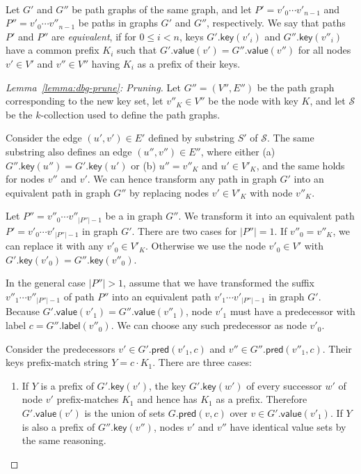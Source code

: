 \documentclass[twoside,leqno,twocolumn]{article}
\newcommand{\abs}[1]{\ensuremath{\lvert #1 \rvert}}
\newcommand{\glabel}{\ensuremath{\mathsf{label}}}
\newcommand{\gpred}{\ensuremath{\mathsf{pred}}}
\newcommand{\gkey}{\ensuremath{\mathsf{key}}}
\newcommand{\gvalue}{\ensuremath{\mathsf{value}}}
\newcommand{\kcollection}[1]{$#1$\nobreakdash-collection}
\begin{document}
\begin{Definition} ~\\
Let $G'$ and $G''$ be path graphs of the same graph, and let $P' = v'_{0} \dotsm v'_{n-1}$ and $P'' = v'_{0} \dotsm v''_{n-1}$ be paths in graphs $G'$ and $G''$, respectively. We say that paths $P'$ and $P''$ are \emph{equivalent}, if for $0 \le i < n$, keys $G'.\gkey(v'_{i})$ and $G''.\gkey(v''_{i})$ have a common prefix $K_{i}$ such that $G'.\gvalue(v') = G''.\gvalue(v'')$ for all nodes $v' \in V'$ and $v'' \in V''$ having $K_{i}$ as a prefix of their keys.
\end{Definition}

\begin{proof}[Lemma~\ref{lemma:dbg-prune}: Pruning]
Let $G'' = (V'', E'')$ be the path graph corresponding to the new key set, let $v''_{K} \in V''$ be the node with key $K$, and let $\mathcal{S}$ be the \kcollection{k} used to define the path graphs.

Consider the edge $(u', v') \in E'$ defined by substring $S'$ of $\mathcal{S}$. The same substring also defines an edge $(u'', v'') \in E''$, where either (a) $G''.\gkey(u'') = G'.\gkey(u')$ or (b) $u'' = v''_{K}$ and $u' \in V'_{K}$, and the same holds for nodes $v''$ and $v'$. We can hence transform any path in graph $G'$ into an equivalent path in graph $G''$ by replacing nodes $v' \in V'_{K}$ with node $v''_{K}$.

Let $P'' = v''_{0} \dotsm v''_{\abs{P''}-1}$ be a in graph $G''$. We transform it into an equivalent path $P' = v'_{0} \dotsm v'_{\abs{P''}-1}$ in graph $G'$. There are two cases for $\abs{P''} = 1$. If $v''_{0} = v''_{K}$, we can replace it with any $v'_{0} \in V'_{K}$. Otherwise we use the node $v'_{0} \in V'$ with $G'.\gkey(v'_{0}) = G''.\gkey(v''_{0})$.

In the general case $\abs{P''} > 1$, assume that we have transformed the suffix $v''_{1} \dotsm v''_{\abs{P''}-1}$ of path $P''$ into an equivalent path $v'_{1} \dotsm v'_{\abs{P''}-1}$ in graph $G'$. Because $G'.\gvalue(v'_{1}) = G''.\gvalue(v''_{1})$, node $v'_{1}$ must have a predecessor with label $c = G''.\glabel(v''_{0})$. We can choose any such predecessor as node $v'_{0}$.

Consider the predecessors $v' \in G'.\gpred(v'_{1}, c)$ and $v'' \in G''.\gpred(v''_{1}, c)$. Their keys prefix-match string $Y = c \cdot K_{1}$. There are three cases:
\begin{enumerate}
\item If $Y$ is a prefix of $G'.\gkey(v')$, the key $G'.\gkey(w')$ of every successor $w'$ of node $v'$ prefix-matches $K_{1}$ and hence has $K_{1}$ as a prefix. Therefore $G'.\gvalue(v')$ is the union of sets $G.\gpred(v, c)$ over $v \in G'.\gvalue(v'_{1})$. If $Y$ is also a prefix of $G''.\gkey(v'')$, nodes $v'$ and $v''$ have identical value sets by the same reasoning.


\end{enumerate}
\end{proof}
\end{document}
